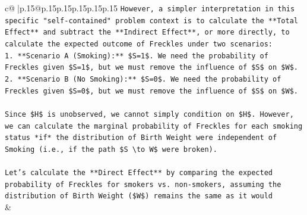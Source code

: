 \documentclass{article}
\begin{document}
{\begin{supertabular}{c@{$\;$}|p{.15\linewidth}@{}p{.15\linewidth}p{.15\linewidth}p{.15\linewidth}p{.15\linewidth}p{.15\linewidth}}
{{{\texttt{However, a simpler interpretation in this specific "self{-}contained" problem context is to calculate the **Total Effect** and subtract the **Indirect Effect**, or more directly, to calculate the expected outcome of Freckles under two scenarios:} \\
\texttt{1.  **Scenario A (Smoking):** \$S=1\$. We need the probability of Freckles given \$S=1\$, but we must remove the influence of \$S\$ on \$W\$.} \\
\texttt{2.  **Scenario B (No Smoking):** \$S=0\$. We need the probability of Freckles given \$S=0\$, but we must remove the influence of \$S\$ on \$W\$.} \\
\\ 
\texttt{Since \$H\$ is unobserved, we cannot simply condition on \$H\$. However, we can calculate the marginal probability of Freckles for each smoking status *if* the distribution of Birth Weight were independent of Smoking (i.e., if the path \$S \textbackslash{}to W\$ were broken).} \\
\\ 
\texttt{Let's calculate the **Direct Effect** by comparing the expected probability of Freckles for smokers vs. non{-}smokers, assuming the distribution of Birth Weight (\$W\$) remains the same as it would} \\
            }
        }
    }
    & \\ \\


\end{supertabular}}
\end{document}
